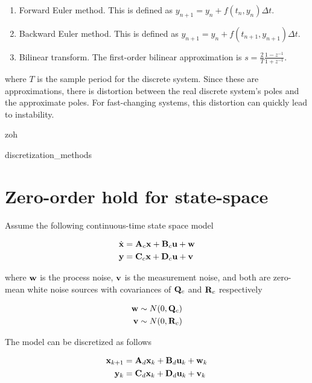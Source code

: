 \begin{enumerate}
  \item Forward Euler method. This is defined as
    $y_{n+1} = y_n + f(t_n, y_n) \Delta t$.
  \item Backward Euler method. This is defined as
    $y_{n+1} = y_n + f(t_{n+1}, y_{n+1}) \Delta t$.
  \item Bilinear transform. The first-order bilinear approximation is
    $s = \frac{2}{T} \frac{1 - z^{-1}}{1 + z^{-1}}$.
\end{enumerate}

where $T$ is the sample period for the discrete system. Since these are
approximations, there is distortion between the real discrete system's poles and
the approximate poles. For fast-changing systems, this distortion can quickly
lead to instability.

\begin{svg}{zoh}
  \caption{Zero-order hold of a system response.}
\end{svg}

\begin{svg}{discretization_methods}
  \caption{Discretization methods of a system response.}
\end{svg}

\section{Zero-order hold for state-space}

Assume the following continuous-time state space model

\begin{align*}
  \dot{\mathbf{x}} &= \mathbf{A}_c\mathbf{x} + \mathbf{B}_c\mathbf{u} + \mathbf{w} \\
  \mathbf{y} &= \mathbf{C}_c\mathbf{x} + \mathbf{D}_c\mathbf{u} + \mathbf{v}
\end{align*}

where $\mathbf{w}$ is the process noise, $\mathbf{v}$ is the measurement noise, and
both are zero-mean white noise sources with covariances of $\mathbf{Q}_c$ and
$\mathbf{R}_c$ respectively

\begin{align*}
  \mathbf{w} &\sim N(0, \mathbf{Q}_c) \\
  \mathbf{v} &\sim N(0, \mathbf{R}_c)
\end{align*}

The model can be discretized as follows

\begin{align*}
  \mathbf{x}_{k+1} &= \mathbf{A}_d \mathbf{x}_k + \mathbf{B}_d \mathbf{u}_k + \mathbf{w}_k \\
   \mathbf{y}_k &= \mathbf{C}_d \mathbf{x}_k + \mathbf{D}_d \mathbf{u}_k + \mathbf{v}_k
\end{align*}

